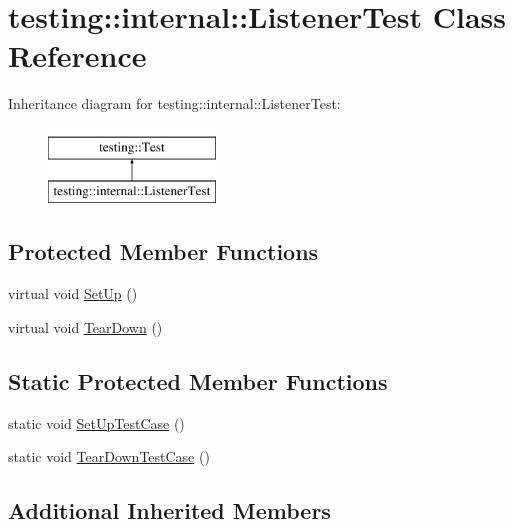 \hypertarget{classtesting_1_1internal_1_1ListenerTest}{}\section{testing\+::internal\+::Listener\+Test Class Reference}
\label{classtesting_1_1internal_1_1ListenerTest}
Inheritance diagram for testing\+::internal\+::Listener\+Test\+:\begin{figure}[H]
\begin{center}
\leavevmode
\includegraphics[height=2.000000cm]{classtesting_1_1internal_1_1ListenerTest}
\end{center}
\end{figure}
\subsection*{Protected Member Functions}
\begin{DoxyCompactItemize}
\item 
virtual void \mbox{\hyperlink{classtesting_1_1internal_1_1ListenerTest_ace3dbe36b705ddf320518e6cdd919bc8}{Set\+Up}} ()
\item 
virtual void \mbox{\hyperlink{classtesting_1_1internal_1_1ListenerTest_ad112535025d668e3ea14e71d8741c810}{Tear\+Down}} ()
\end{DoxyCompactItemize}
\subsection*{Static Protected Member Functions}
\begin{DoxyCompactItemize}
\item 
static void \mbox{\hyperlink{classtesting_1_1internal_1_1ListenerTest_a7cbc298576e584b4021d0375204b7391}{Set\+Up\+Test\+Case}} ()
\item 
static void \mbox{\hyperlink{classtesting_1_1internal_1_1ListenerTest_aa35b5f1c6235f0fe98aa2c7f35bb8fe1}{Tear\+Down\+Test\+Case}} ()
\end{DoxyCompactItemize}
\subsection*{Additional Inherited Members}


